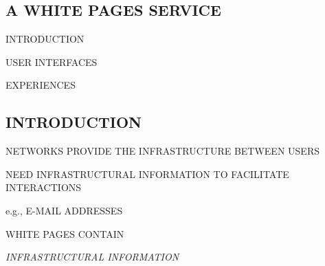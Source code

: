 \begin{bwslide}
\part	{A WHITE PAGES SERVICE}\bf

\begin{nrtc}
\item	INTRODUCTION

\item	USER INTERFACES

\item	EXPERIENCES
\end{nrtc}
\end{bwslide}


\begin{bwslide}
\part*	{INTRODUCTION}\bf

\begin{nrtc}
\item	NETWORKS PROVIDE THE INFRASTRUCTURE BETWEEN USERS

\item	NEED INFRASTRUCTURAL INFORMATION TO FACILITATE INTERACTIONS
    \begin{nrtc}
    \item	e.g., E-MAIL ADDRESSES
    \end{nrtc}

\item	WHITE PAGES CONTAIN 
    \begin{nrtc}
    \item	\emph{INFRASTRUCTURAL INFORMATION}
    \end{nrtc}
\end{nrtc}
\end{bwslide}


